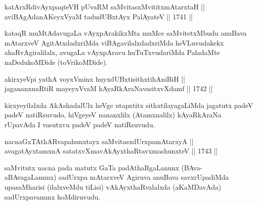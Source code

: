 \begin{shl}
katArxRdivAyxpaqteVH pUvaRM saMvitasxMvititxmAtarxtaH || \\
aviBAgAdanAKeyxVyaM \footnotemark[3]tadudUBxtAyx PalAyateV ||  1741 ||  
\end{shl}

\begin{artha}
kataqR muMtAdavugaLa vAyxpArakikxMta muMce
saMvitetxMbudu anuBava mAtarxveV AgitAtxdadxriMda
viBAgavilalxdadxriMda heVLuvudakekx
ahaRvAgiralilalx, \footnotemark[2]avugaLa vAyxpAravu huTuTxvudariMda
PaladaMte naDedukoMDide (toVrikoMDide).
\end{artha}


\begin{shl}
akirxyeV\s pi yathA voyxVminx huyxdUBxtisithxtihAniBiH || \\
jagananxnaRtiR mayeyxVvaM kAyaRkAraNavasitxvXdamf ||  1742 ||  
\end{shl}

\begin{artha}
kirxyeyilalxda AkAshadalUlx heVge utapxtitx sithxtilayagaLiMda
jagatutx padeV padeV natiRsuvudo, hiVgeyeV nananxlilx (Atamxnalilx)
kAyaRkAraNa rUpavAda I vasutxvu padeV padeV natiRsuvudu.
\end{artha}


\begin{shl}
nacnaGxTAthARvapahunxtayx saMvitasxdUrxpamAtarxyA ||  \\
avagatAyxtamxnA satatxvXmavAkAyxthaRtavxmashunxteV ||  1743 || 
\end{shl}

\begin{artha}
saMvitutx nacna pada matutx GaTa padAthaRgaLanunx (BAva-aBAvagaLanunx)
sadUrxpa mAtarxveV Agiruva anuBava savxrUpadiMda upasaMharisi
(ilalxveMdu tiLisi) vAkAyxthaRvalalxda (aKaMDavAda) sadUrxpavanunx
hoMdiruvudu.
\end{artha}

